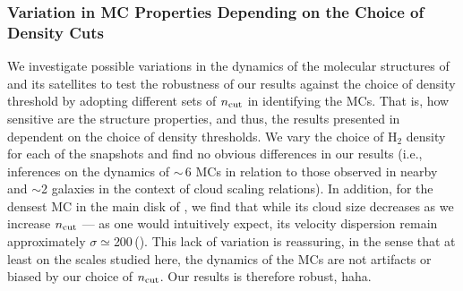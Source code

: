 \documentclass[iop]{emulateapj} %
\begin{document}



\subsubsection{Variation in MC Properties Depending on the Choice of Density Cuts}	 \label{sec:ncut}
We investigate possible variations in the dynamics of the molecular structures of \flower and its satellites
to test
the robustness of our results against the choice of density threshold by adopting
different sets of $n_{\rm cut}$ in identifying the MCs.
That is, how sensitive are the structure properties, and thus, the results presented in 
dependent on the choice of density thresholds.
We vary the choice of H$_2$ density for each of the snapshots and
find no obvious differences in our results (i.e., inferences on the dynamics of \z$\sim$\,6
MCs in relation to those observed in nearby and \z$\sim$2 galaxies in the context of
cloud scaling relations).
In addition, for the densest MC in the main disk of \flower, we find that while
its cloud size decreases as we increase $n_{\rm cut}$ --- as one would intuitively expect,
its velocity dispersion remain
approximately $\sigma\simeq$200\,\kms ().
This lack of variation is reassuring, in the sense that at least on the scales studied here,
the dynamics of the MCs are not artifacts or biased by our choice of $n_{\rm cut}$.
Our results is therefore robust, haha.

\end{document}
